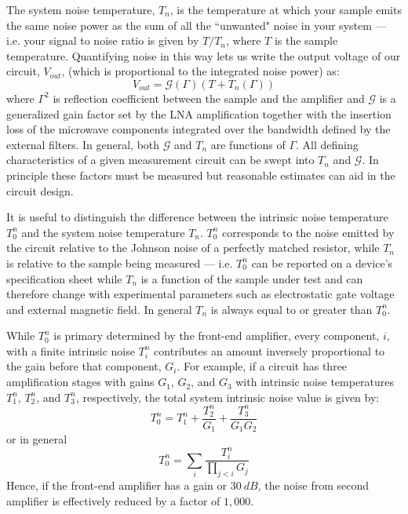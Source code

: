 The system noise temperature, $T_n$, is the temperature at which your sample emits the same noise power as the sum of all the ``unwanted" noise in your system --- i.e. your signal to noise ratio is given by $T/T_n$, where $T$ is the sample temperature. Quantifying noise in this way lets us write the output voltage of our circuit, $V_{out}$, (which is proportional to the integrated noise power) as:
\begin{equation}\label{eq:power_output}
V_{out} = \mathcal{G}(\Gamma)(T+T_n(\Gamma))
\end{equation}
where $\Gamma^2$ is reflection coefficient between the sample and the amplifier and $\mathcal{G}$ is a generalized gain factor set by the LNA amplification together with the insertion loss of the microwave components integrated over the bandwidth defined by the external filters. In general, both $\mathcal{G}$ and $T_n$ are functions of $\Gamma$. All defining characteristics of a given measurement circuit can be swept into $T_n$ and $\mathcal{G}$. In principle these factors must be measured but reasonable estimates can aid in the circuit design.

It is useful to distinguish the difference between the intrinsic noise temperature $T_0^n$ and the system noise temperature $T_n$. $T_0^n$ corresponds to the noise emitted by the circuit relative to the Johnson noise of a perfectly matched resistor, while $T_n$ is relative to the sample being measured --- i.e. $T_0^n$ can be reported on a device's specification sheet while $T_n$ is a function of the sample under test and can therefore change with experimental parameters such as electrostatic gate voltage and external magnetic field. In general $T_n$ is always equal to or greater than $T_0^n$.

While $T_0^n$ is primary determined by the front-end amplifier, every component, $i$, with a finite intrinsic noise $T_i^n$ contributes an amount inversely proportional to the gain before that component, $G_i$. For example, if a circuit has three amplification stages with gains $G_1$, $G_2$, and $G_3$ with intrinsic noise temperatures $T_1^n$, $T_2^n$, and $T_3^n$, respectively, the total system intrinsic noise value is given by:
\begin{equation}
T_0^n = T_1^n+\frac{T_2^n}{G_1}+\frac{T_3^n}{G_1G_2}
\end{equation}
or in general
\begin{equation}
T_0^n = \sum_{i}\frac{T_i^n}{\prod_{j<i}G_j}
\end{equation}
Hence, if the front-end amplifier has a gain or $30~dB$, the noise from second amplifier is effectively reduced by a factor of $1,000$.

